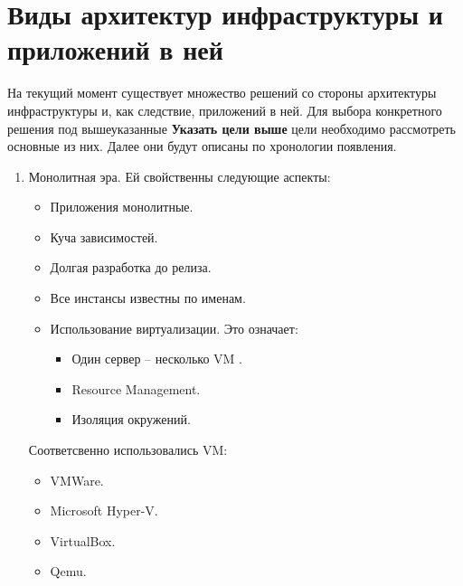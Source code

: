 \section{Виды архитектур инфраструктуры и приложений в ней}
\label{sec:history}

На текущий момент существует множество решений со стороны архитектуры инфраструктуры и, как следствие, приложений в ней. Для выбора конкретного решения под вышеуказанные \textbf{Указать цели выше} цели необходимо рассмотреть основные из них. Далее они будут описаны по хронологии появления.

\begin{enumerate}
    \item Монолитная эра. Ей свойственны следующие аспекты:
        \begin{itemize}
            \item Приложения монолитные.
            \item Куча зависимостей.
            \item Долгая разработка до релиза.
            \item Все инстансы известны по именам.
            \item Использование виртуализации. Это означает:
                \begin{itemize}
                    \item Один сервер -- несколько VM \cite{wiki:vm}.
                    \item Resource Management.
                    \item Изоляция окружений.
                \end{itemize}
        \end{itemize}

        Соответсвенно использовались VM:
        \begin{itemize}
            \item VMWare.
            \item Microsoft Hyper-V.
            \item VirtualBox.
            \item Qemu.
        \end{itemize}


\end{enumerate}
